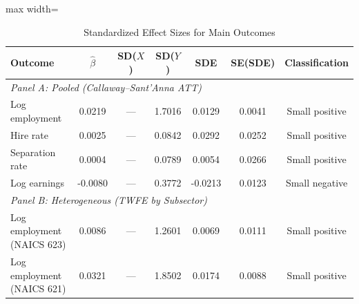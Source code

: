 
\begin{table}[H]
\centering
\caption{Standardized Effect Sizes for Main Outcomes}
\label{tab:sde}
\begin{threeparttable}
\begin{adjustbox}{max width=\textwidth}
\begin{tabular}{lcccccc}
\toprule
Outcome & $\hat{\beta}$ & SD($X$) & SD($Y$) & SDE & SE(SDE) & Classification \\
\midrule
\multicolumn{7}{l}{\textit{Panel A: Pooled (Callaway--Sant'Anna ATT)}} \\
Log employment & 0.0219 & --- & 1.7016 & 0.0129 & 0.0041 & Small positive \\
Hire rate & 0.0025 & --- & 0.0842 & 0.0292 & 0.0252 & Small positive \\
Separation rate & 0.0004 & --- & 0.0789 & 0.0054 & 0.0266 & Small positive \\
Log earnings & -0.0080 & --- & 0.3772 & -0.0213 & 0.0123 & Small negative \\

\midrule
\multicolumn{7}{l}{\textit{Panel B: Heterogeneous (TWFE by Subsector)}} \\
Log employment (NAICS 623) & 0.0086 & --- & 1.2601 & 0.0069 & 0.0111 & Small positive \\
Log employment (NAICS 621) & 0.0321 & --- & 1.8502 & 0.0174 & 0.0088 & Small positive \\


\end{tabular}
\end{adjustbox}
\end{threeparttable}
\end{table}
